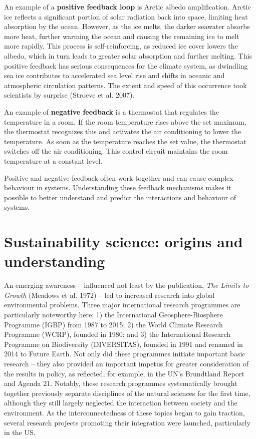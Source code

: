 \documentclass[
  a4paper,
  DIV=11,
  numbers=noendperiod,
  oneside,
  openany]{scrreprt}
\begin{document}
An example of a \textbf{positive feedback loop} is Arctic albedo
amplification. Arctic ice reflects a significant portion of solar
radiation back into space, limiting heat absorption by the ocean.
However, as the ice melts, the darker seawater absorbs more heat,
further warming the ocean and causing the remaining ice to melt more
rapidly. This process is self-reinforcing, as reduced ice cover lowers
the albedo, which in turn leads to greater solar absorption and further
melting. This positive feedback has serious consequences for the climate
system, as dwindling sea ice contributes to accelerated sea level rise
and shifts in oceanic and atmospheric circulation patterns. The extent
and speed of this occurrence took scientists by surprise (Stroeve et al.
2007).

An example of \textbf{negative feedback} is a thermostat that regulates
the temperature in a room. If the room temperature rises above the set
maximum, the thermostat recognizes this and activates the air
conditioning to lower the temperature. As soon as the temperature
reaches the set value, the thermostat switches off the air conditioning.
This control circuit maintains the room temperature at a constant level.

Positive and negative feedback often work together and can cause complex
behaviour in systems. Understanding these feedback mechanisms makes it
possible to better understand and predict the interactions and behaviour
of systems.

\section{Sustainability science: origins and
understanding}\label{sustainability-science-origins-and-understanding}

An emerging awareness -- influenced not least by the publication,
\emph{The Limits to Growth} (Meadows et al. 1972) -- led to increased
research into global environmental problems. Three major international
research programmes are particularly noteworthy here: 1) the
International Geosphere-Biosphere Programme (IGBP) from 1987 to 2015; 2)
the World Climate Research Programme (WCRP), founded in 1980; and 3) the
International Research Programme on Biodiversity (DIVERSITAS), founded
in 1991 and renamed in 2014 to Future Earth. Not only did these
programmes initiate important basic research -- they also provided an
important impetus for greater consideration of the results in policy, as
reflected, for example, in the UN's Brundtland Report and Agenda 21.
Notably, these research programmes systematically brought together
previously separate disciplines of the natural sciences for the first
time, although they still largely neglected the interaction between
society and the environment. As the interconnectedness of these topics
began to gain traction, several research projects promoting their
integration were launched, particularly in the US.
\end{document}

